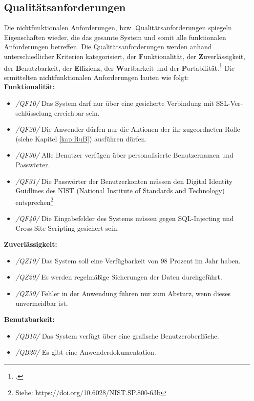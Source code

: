 \subsection{Qualitätsanforderungen}
Die nichtfunktionalen Anforderungen, bzw. Qualitätsanforderungen spiegeln Eigenschaften wieder, die das gesamte System und somit alle funktionalen Anforderungen betreffen. Die Qualitätsanforderungen werden anhand unterschiedlicher Kriterien kategorisiert, der \textbf{F}unktionalität, der \textbf{Z}uverlässigkeit, der \textbf{B}enutzbarkeit, der \textbf{E}ffizienz, der \textbf{W}artbarkeit und der \textbf{P}ortabilität.\footcite[Vgl.][S. 494 f.]{balzert} Die ermittelten nichtfunktionalen Anforderungen lauten wie folgt:
\vspace{0.5cm}
\\\textbf{Funktionalität:}
\begin{itemize}
    \item[] \emph{/QF10/} Das System darf nur über eine gesicherte Verbindung mit SSL-Ver-schlüsselung erreichbar sein.
    \item[] \emph{/QF20/} Die Anwender dürfen nur die Aktionen der ihr zugeordneten Rolle (siehe Kapitel \ref{kap:RuB}) ausführen dürfen.
    \item[] \emph{/QF30/} Alle Benutzer verfügen über personalisierte Benutzernamen und Passwörter.
    \item[] \emph{/QF31/} Die Passwörter der Benutzerkonten müssen den \glqq{}Digital Identity Guidlines\grqq{} des NIST (National Institute of Standards and Technology) entsprechen\footnote{Siehe: https://doi.org/10.6028/NIST.SP.800-63b}
    \item[] \emph{/QF40/} Die Eingabefelder des Systems müssen gegen SQL-Injecting und Cross-Site-Scripting gesichert sein.
\end{itemize}
\vspace{0.5cm}
\textbf{Zuverlässigkeit:}
\begin{itemize}
    \item[] \emph{/QZ10/} Das System soll eine Verfügbarkeit von 98 Prozent im Jahr haben.
    \item[] \emph{/QZ20/} Es werden regelmäßige Sicherungen der Daten durchgeführt.
    \item[] \emph{/QZ30/} Fehler in der Anwendung führen nur zum Absturz, wenn dieses unvermeidbar ist.
\end{itemize}
\vspace{0.5cm}
\textbf{Benutzbarkeit:}
\begin{itemize}
    \item[] \emph{/QB10/} Das System verfügt über eine grafische Benutzeroberfläche.
    \item[] \emph{/QB20/} Es gibt eine Anwenderdokumentation.
\end{itemize}
